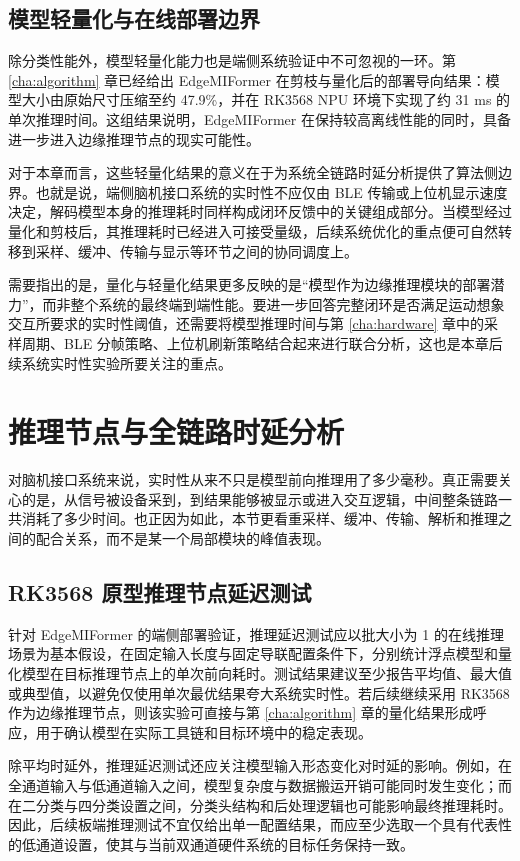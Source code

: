 \subsection{模型轻量化与在线部署边界}

除分类性能外，模型轻量化能力也是端侧系统验证中不可忽视的一环。第 \ref{cha:algorithm} 章已经给出 EdgeMIFormer 在剪枝与量化后的部署导向结果：模型大小由原始尺寸压缩至约 47.9\%，并在 RK3568 NPU 环境下实现了约 31 ms 的单次推理时间。这组结果说明，EdgeMIFormer 在保持较高离线性能的同时，具备进一步进入边缘推理节点的现实可能性。

对于本章而言，这些轻量化结果的意义在于为系统全链路时延分析提供了算法侧边界。也就是说，端侧脑机接口系统的实时性不应仅由 BLE 传输或上位机显示速度决定，解码模型本身的推理耗时同样构成闭环反馈中的关键组成部分。当模型经过量化和剪枝后，其推理耗时已经进入可接受量级，后续系统优化的重点便可自然转移到采样、缓冲、传输与显示等环节之间的协同调度上。

需要指出的是，量化与轻量化结果更多反映的是“模型作为边缘推理模块的部署潜力”，而非整个系统的最终端到端性能。要进一步回答完整闭环是否满足运动想象交互所要求的实时性阈值，还需要将模型推理时间与第 \ref{cha:hardware} 章中的采样周期、BLE 分帧策略、上位机刷新策略结合起来进行联合分析，这也是本章后续系统实时性实验所要关注的重点。

\section{推理节点与全链路时延分析}

对脑机接口系统来说，实时性从来不只是模型前向推理用了多少毫秒。真正需要关心的是，从信号被设备采到，到结果能够被显示或进入交互逻辑，中间整条链路一共消耗了多少时间。也正因为如此，本节更看重采样、缓冲、传输、解析和推理之间的配合关系，而不是某一个局部模块的峰值表现。

\subsection{RK3568 原型推理节点延迟测试}

针对 EdgeMIFormer 的端侧部署验证，推理延迟测试应以批大小为 1 的在线推理场景为基本假设，在固定输入长度与固定导联配置条件下，分别统计浮点模型和量化模型在目标推理节点上的单次前向耗时。测试结果建议至少报告平均值、最大值或典型值，以避免仅使用单次最优结果夸大系统实时性。若后续继续采用 RK3568 作为边缘推理节点，则该实验可直接与第 \ref{cha:algorithm} 章的量化结果形成呼应，用于确认模型在实际工具链和目标环境中的稳定表现。

除平均时延外，推理延迟测试还应关注模型输入形态变化对时延的影响。例如，在全通道输入与低通道输入之间，模型复杂度与数据搬运开销可能同时发生变化；而在二分类与四分类设置之间，分类头结构和后处理逻辑也可能影响最终推理耗时。因此，后续板端推理测试不宜仅给出单一配置结果，而应至少选取一个具有代表性的低通道设置，使其与当前双通道硬件系统的目标任务保持一致。

